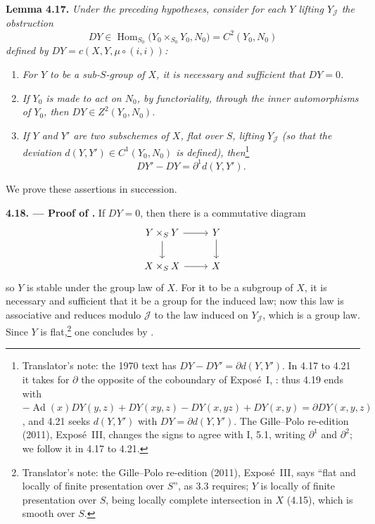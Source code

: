 

\medskip
\noindent{}\textbf{Lemma 4.17.}
\textit{Under the preceding hypotheses, consider for each \(Y\) lifting
\(Y_{\mathscr J}\) the obstruction}
\[
 DY\in
 \operatorname{Hom}_{S_0}
 \bigl(Y_0\mathbin{\times_{S_0}}Y_0,N_0\bigr)
 =C^2(Y_0,N_0)
\]
\textit{defined by \(DY=c(X,Y,\mu\circ(i,i))\):}

\begin{center}
\end{center}

\begin{enumerate}
\item[\SGAInlineRefTarget{sga3:iii:lemma:4-17:item:i}(i)] \textit{For \(Y\) to be a sub-\(S\)-group of \(X\), it is
  necessary and sufficient that \(DY=0\).}
\item[\SGAInlineRefTarget{sga3:iii:lemma:4-17:item:ii}(ii)] \textit{If \(Y_0\) is made to act on \(N_0\), by
  functoriality, through the inner automorphisms of \(Y_0\), then
  \(DY\in Z^2(Y_0,N_0)\).}
\item[\SGAInlineRefTarget{sga3:iii:lemma:4-17:item:iii}(iii)] \textit{If \(Y\) and \(Y'\) are two subschemes of \(X\),
  flat over \(S\), lifting \(Y_{\mathscr J}\) (so that the deviation
  \(d(Y,Y')\in C^1(Y_0,N_0)\) is defined), then}\footnote{Translator's note: the 1970 text has
  \(DY-DY'=\partial d(Y,Y')\). In 4.17 to 4.21 it takes for \(\partial\) the
  opposite of the coboundary of Exposé~I, : thus 4.19 ends with
  \(-\operatorname{Ad}(x)DY(y,z)+DY(xy,z)-DY(x,yz)+DY(x,y)=\partial DY(x,y,z)\),
  and 4.21 seeks \(d(Y,Y')\) with \(DY=\partial d(Y,Y')\). The Gille--Polo
  re-edition (2011), Exposé~III, changes the signs to agree with I, 5.1,
  writing \(\partial^1\) and \(\partial^2\); we follow it in 4.17 to 4.21.}
  \[
   DY'-DY=\partial^1d(Y,Y').
  \]
\end{enumerate}

We prove these assertions in succession.

\medskip
\noindent{}\textbf{4.18. --- Proof of .}
If \(DY=0\), then there is a commutative diagram
\[
\begin{tikzcd}
 Y\times_SY\arrow[r]\arrow[d]&Y\arrow[d]\\
 X\times_SX\arrow[r]&X
\end{tikzcd}
\]
so \(Y\) is stable under the group law of \(X\). For it to be a subgroup
of \(X\), it is necessary and sufficient that it be a group for the
induced law; now this law is associative and reduces modulo
\(\mathscr J\) to the law induced on \(Y_{\mathscr J}\), which is a group
law. Since \(Y\) is flat,\footnote{Translator's note: the Gille--Polo re-edition (2011), Exposé~III, says ``flat and
locally of finite presentation over \(S\)'', as 3.3 requires; \(Y\) is locally
of finite presentation over \(S\), being locally complete intersection in
\(X\) (4.15), which is smooth over \(S\).} one concludes by .

